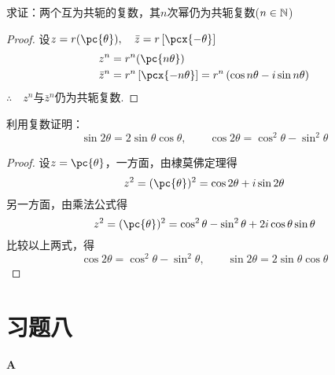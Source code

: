 \begin{example}
    求证：两个互为共轭的复数，其$n$次幂仍为共轭复数($n\in\mathbb{N}$)
\end{example}

\begin{proof}
设$z=r(\pc{\theta}),\quad \bar z=r\left[\pcx{-\theta}\right]$
\[\begin{split}
    z^n&=r^n(\pc{n\theta})\\
\bar z^n&=r^n\left[\pcx{-n\theta}\right]=r^n\left(\cos n\theta-i\sin n\theta\right)
\end{split}\]
$\therefore\quad z^n$与$\bar z^{n}$仍为共轭复数.
\end{proof}

\begin{example}
利用复数证明：
\[\sin2\theta=2\sin\theta\cos\theta,\qquad \cos2\theta=\cos^2\theta-\sin^2\theta\]
\end{example}

\begin{proof}
设$z=\pc{\theta}$，一方面，由棣莫佛定理得
\[z^2=(\pc{\theta})^2=\cos2\theta+i\sin2\theta\]
另一方面，由乘法公式得
    \[z^2=(\pc{\theta})^2=\cos^2\theta-\sin^2\theta+2i\cos\theta\sin\theta\]
    比较以上两式，得
    \[\cos2\theta=\cos^2\theta-\sin^2\theta,\qquad \sin2\theta=2\sin\theta\cos\theta\]
\end{proof}

\section*{习题八}
\begin{center}
    \bfseries A
\end{center}

